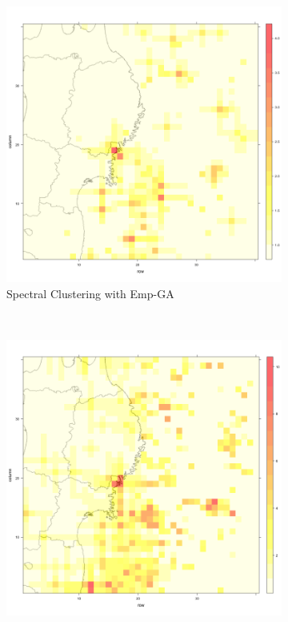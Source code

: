 \begin{figure}
\begin{subfigure}{.5\textwidth}
  \includegraphics[width=1\linewidth]{img/SC-EMP-ga}
  \caption{Spectral Clustering with Emp-GA}
  \label{fig:sub2}
\end{subfigure}\\
\begin{subfigure}{.5\textwidth}
  \centering
  \includegraphics[width=1\linewidth]{img/EMP-RED-ga}

\end{subfigure}
\end{figure}
